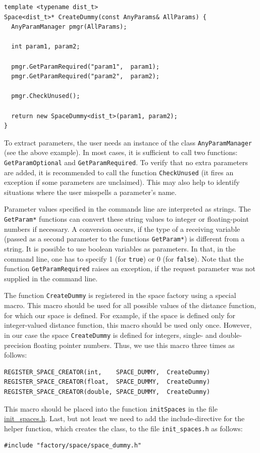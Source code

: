 \documentclass[runningheads,a4paper]{llncs}
\newcommand{\replocfile}{https://github.com/searchivarius/NonMetricSpaceLib/blob/pserv/}
\newcommand{\ttt}[1]{\texttt{#1}}
\begin{document}
\begin{verbatim}
template <typename dist_t>
Space<dist_t>* CreateDummy(const AnyParams& AllParams) {
  AnyParamManager pmgr(AllParams);

  int param1, param2;

  pmgr.GetParamRequired("param1",  param1);
  pmgr.GetParamRequired("param2",  param2);

  pmgr.CheckUnused();

  return new SpaceDummy<dist_t>(param1, param2);
}
\end{verbatim}
To extract parameters, the user needs an instance of the class \ttt{AnyParamManager} (see the above example).
In most cases, it is sufficient to call two functions: \ttt{GetParamOptional} and
\ttt{GetParamRequired}.
To verify that no extra parameters are added, it is recommended to call the function \ttt{CheckUnused}
(it fires an exception if some parameters are unclaimed).
This may also help to identify situations where the user misspells 
a parameter's name.


Parameter values specified in the commands line are interpreted as strings.
The \ttt{GetParam*} functions can convert these string values
to integer or floating-point numbers if necessary.
A conversion occurs, if the type of a receiving variable (passed as a second parameter
to the functions \ttt{GetParam*}) is different from a string.
It is possible to use boolean variables as parameters.
In that, in the command line, one has to specify 1 (for \ttt{true}) or 0 (for \ttt{false}).
Note that the function \ttt{GetParamRequired} raises an exception, 
if the request parameter was not supplied in the command line.

The function \ttt{CreateDummy} is registered in the space factory using a special macro.
This macro should be used for all possible values of the distance function,
for which our space is defined. For example, if the space is defined
only for integer-valued distance function, this macro should be used only once.
However, in our case the space \ttt{CreateDummy} is defined for integers,
single- and double-precision floating pointer numbers. Thus, we use this macro
three times as follows:
\begin{verbatim}
REGISTER_SPACE_CREATOR(int,    SPACE_DUMMY,  CreateDummy)
REGISTER_SPACE_CREATOR(float,  SPACE_DUMMY,  CreateDummy)
REGISTER_SPACE_CREATOR(double, SPACE_DUMMY,  CreateDummy)
\end{verbatim}

This macro should be placed into the function \ttt{initSpaces} in the 
file 
\href{\replocfile similarity_search/include/factory/init\_spaces.h}{init\_spaces.h}.
Last, but not least we need to add the include-directive
for the helper function, which creates
the class, to the file \ttt{init\_spaces.h} as follows:
\begin{verbatim}
#include "factory/space/space_dummy.h"
\end{verbatim}
\end{document}
